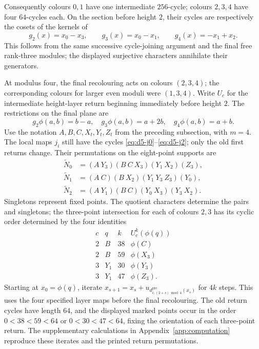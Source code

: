 \documentclass[11pt,reqno]{amsart}
\numberwithin{equation}{section}
\theoremstyle{definition}
\theoremstyle{remark}
\begin{document}
Consequently colours $0,1$ have one intermediate $256$-cycle; colours $2,3,4$
have four $64$-cycles each. On the section before height $2$, their cycles are
respectively the cosets of the kernels of
\[
 g_2(x)=x_0-x_3,\qquad g_3(x)=x_0-x_1,\qquad g_4(x)=-x_1+x_2.
\]
This follows from the same successive cycle-joining argument and the final free rank-three
modules; the displayed surjective characters annihilate their generators.

At modulus four, the final recolouring acts on colours $(2,3,4)$; the
corresponding colours for larger even moduli were $(1,3,4)$.
Write $U_c$ for the intermediate height-layer return beginning immediately before height
$2$. The restrictions on the final plane are
\[
 g_2\phi(a,b)=b-a,\quad g_3\phi(a,b)=a+2b,\quad g_4\phi(a,b)=a+b.
\]
Use the notation $A,B,C,X_t,Y_t,Z_t$ from the preceding subsection, with $m=4$.
The local maps $j_i$ still have the cycles
\eqref{eq:d5-j0}--\eqref{eq:d5-j2}; only the old first returns change.
Their permutations on the eight-point supports are
\begin{align}
 \widetilde N_0&=(A\ Y_3)(B\ C\ X_3)(Y_1\ X_2)(Z_3),\label{eq:d5four-N0}\\
 \widetilde N_1&=(A\ C)(B\ X_2)(Y_1\ Y_3\ Z_3)(Y_0),\label{eq:d5four-N1}\\
 \widetilde N_2&=(A\ Y_1)(B\ C)(Y_0\ X_3)(Y_3\ X_2).\label{eq:d5four-N2}
\end{align}
Singletons represent fixed points. The quotient characters determine
the pairs and singletons; the three-point intersection for each of
colours $2,3$ has its cyclic order determined by the four identities
\begin{equation}\label{eq:d5four-iterate}
\begin{array}{c|c|c|c}
 c&q&k&U_c^k(\phi(q))\\\hline
 2&B&38&\phi(C)\\
 2&B&59&\phi(X_3)\\
 3&Y_1&30&\phi(Y_3)\\
 3&Y_1&47&\phi(Z_3).
\end{array}
\end{equation}
Starting at $x_0=\phi(q)$, iterate
$x_{s+1}=x_s+u_{d^{\mathrm{pre}}_{c,(2+s)\bmod4}(x_s)}$ for $4k$ steps.
This uses the four specified layer maps before the final recolouring.
The old return cycles have length $64$, and the displayed marked points
occur in the order $0<38<59<64$ or $0<30<47<64$, fixing the orientation
of each three-point return. The supplementary calculations in
Appendix~\ref{app:computation} reproduce these iterates and the printed
return permutations.
\end{document}
